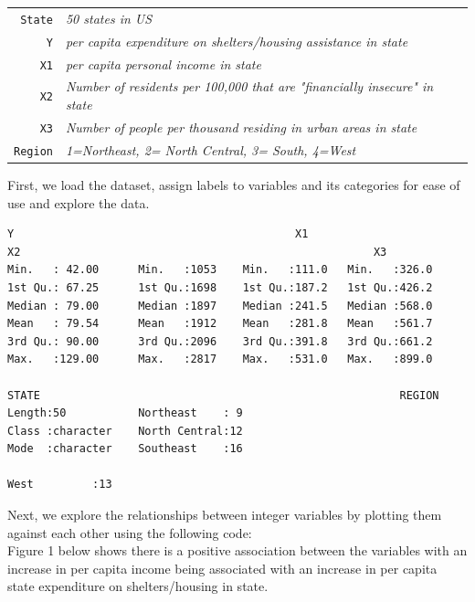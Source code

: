 \documentclass[12pt,letterpaper]{article}
\begin{document}
\begin{tabular}{r|l}
	\texttt{State} &\emph{50 states in US} \\
	\texttt{Y} & \emph{per capita expenditure on shelters/housing assistance in state}\\
	\texttt{X1} &\emph{per capita personal income in state} \\
	\texttt{X2} &  \emph{Number of residents per 100,000 that are "financially insecure" in state}\\
	\texttt{X3} &  \emph{Number of people per thousand residing in urban areas in state} \\
	\texttt{Region} &  \emph{1=Northeast, 2= North Central, 3= South, 4=West} \\
	
\end{tabular}
\vspace{.2cm}

\noindent First, we load the dataset, assign labels to variables and its categories for ease of use and explore the data. \\

 

\begin{verbatim}
Y	      									X1	      						X2														X3
Min.   : 42.00  	Min.   :1053  	Min.   :111.0  	Min.   :326.0  
1st Qu.: 67.25  	1st Qu.:1698  	1st Qu.:187.2  	1st Qu.:426.2  
Median : 79.00  	Median :1897  	Median :241.5  	Median :568.0  
Mean   : 79.54  	Mean   :1912  	Mean   :281.8  	Mean   :561.7  
3rd Qu.: 90.00  	3rd Qu.:2096  	3rd Qu.:391.8  	3rd Qu.:661.2  
Max.   :129.00  	Max.   :2817  	Max.   :531.0  	Max.   :899.0  

STATE														REGION		
Length:50         	Northeast    : 9  		
Class :character  	North Central:12  		
Mode  :character  	Southeast    :16  		
																			West         :13  		              
\end{verbatim}

\noindent Next, we explore the relationships between integer variables by plotting them against each other using the following code:\\

 

\noindent Figure 1 below shows there is a positive association between the variables with an increase in per capita income being associated with an increase in per capita state expenditure on shelters/housing in state.\\
\end{document}
